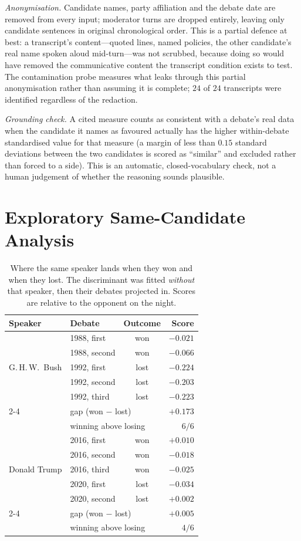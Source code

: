\documentclass[journal]{IEEEtran}
\begin{document}
\emph{Anonymisation.} Candidate names, party affiliation and the debate date
are removed from every input; moderator turns are dropped entirely, leaving
only candidate sentences in original chronological order. This is a partial
defence at best: a transcript's content---quoted lines, named policies, the
other candidate's real name spoken aloud mid-turn---was not scrubbed, because
doing so would have removed the communicative content the transcript
condition exists to test. The contamination probe measures what leaks
through this partial anonymisation rather than assuming it is complete;
$24$ of $24$ transcripts were identified regardless of the redaction.

\emph{Grounding check.} A cited measure counts as consistent with a debate's
real data when the candidate it names as favoured actually has the higher
within-debate standardised value for that measure (a margin of less than
$0.15$ standard deviations between the two candidates is scored as
``similar'' and excluded rather than forced to a side). This is an automatic,
closed-vocabulary check, not a human judgement of whether the reasoning
sounds plausible.

\section{Exploratory Same-Candidate Analysis}
\label{app:samecand}

\begin{table}[h]
\caption{Where the same speaker lands when they won and when they lost. The
discriminant was fitted \emph{without} that speaker, then their debates
projected in. Scores are relative to the opponent on the night.}
\label{tab:within}
\centering
\footnotesize
\begin{tabular}{llcr}
\toprule
Speaker & Debate & Outcome & Score \\
\midrule
\multirow{5}{*}{G.\,H.\,W.\ Bush}
 & 1988, first  & won  & $-0.021$ \\
 & 1988, second & won  & $-0.066$ \\
 & 1992, first  & lost & $-0.224$ \\
 & 1992, second & lost & $-0.203$ \\
 & 1992, third  & lost & $-0.223$ \\
\cmidrule(lr){2-4}
 & \multicolumn{2}{l}{gap (won $-$ lost)} & $+0.173$ \\
 & \multicolumn{2}{l}{winning above losing} & $6/6$ \\
\midrule
\multirow{5}{*}{Donald Trump}
 & 2016, first  & won  & $+0.010$ \\
 & 2016, second & won  & $-0.018$ \\
 & 2016, third  & won  & $-0.025$ \\
 & 2020, first  & lost & $-0.034$ \\
 & 2020, second & lost & $+0.002$ \\
\cmidrule(lr){2-4}
 & \multicolumn{2}{l}{gap (won $-$ lost)} & $+0.005$ \\
 & \multicolumn{2}{l}{winning above losing} & $4/6$ \\
\bottomrule
\end{tabular}
\end{table}
\end{document}
